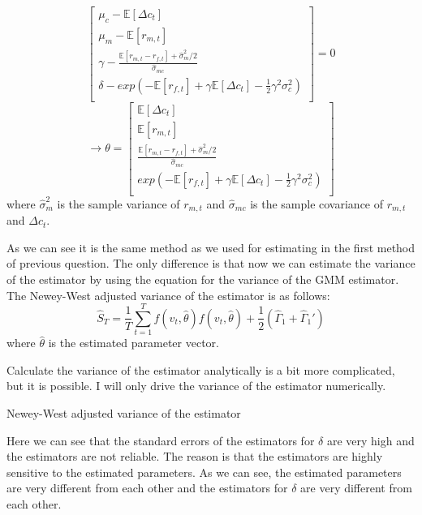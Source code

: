 \begin{enumerate}[(a)]
\begin{equation*}
\begin{bmatrix}
          \mu_c - \mathbb{E} [\Delta c_t] \\
          \mu_m - \mathbb{E} [r_{m,t}] \\
          \gamma - \frac{\mathbb{E} [r_{m,t}- r_{f,t}] + \hat{\sigma}_m^2/2}{\hat{\sigma}_{mc} } \\
          \delta - exp(- \mathbb{E} [r_{f,t}] + \gamma\mathbb{E} [\Delta c_t] - \frac{1}{2}\gamma^2 \sigma_c^2 )  \\
        \end{bmatrix} = 0
      \end{equation*}
      \begin{equation*}
        \rightarrow  \theta = \begin{bmatrix}
          \mathbb{E} [\Delta c_t] \\
          \mathbb{E} [r_{m,t}] \\
          \frac{\mathbb{E} [r_{m,t}- r_{f,t}] + \hat{\sigma}_m^2/2}{\hat{\sigma}_{mc} } \\
          exp(- \mathbb{E} [r_{f,t}] + \gamma\mathbb{E} [\Delta c_t] - \frac{1}{2}\gamma^2 \sigma_c^2 )  \\
        \end{bmatrix}
      \end{equation*}
      where $\hat{\sigma}_m^2$ is the sample variance of $r_{m,t}$ and $\hat{\sigma}_{mc}$ is the sample covariance of $r_{m,t}$ and $\Delta c_t$.

      As we can see it is the same method as we used for estimating in the first method of previous question. The only difference is that now we can estimate the variance of the estimator by using the equation for the variance of the GMM estimator. The Newey-West adjusted variance of the estimator is as follows:    
      \begin{equation*}
        \hat{S}_T = \frac{1}{T} \sum_{t=1}^T f(v_t,\hat{\theta})f(v_t,\hat{\theta}) + \frac{1}{2}(\hat{\Gamma}_1 + \hat{\Gamma}_1')
      \end{equation*}
      where $\hat{\theta}$ is the estimated parameter vector. 

      Calculate the variance of the estimator analytically is a bit more complicated, but it is possible. I will only drive the variance of the estimator numerically. 
      \begin{table}[htbp!]
        \centering
        \caption{Newey-West adjusted variance of the estimator}
        \label{tab:1d}
        
      \end{table}
      Here we can see that the standard errors of the estimators for $\delta$ are very high and the estimators are not reliable. The reason is that the estimators are highly sensitive to the estimated parameters. As we can see, the estimated parameters are very different from each other and the estimators for $\delta$ are very different from each other.


\end{enumerate}

